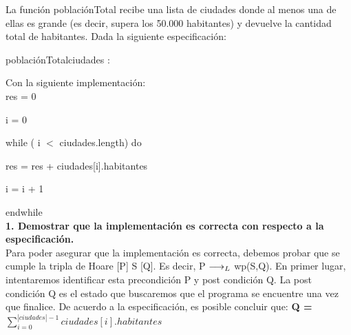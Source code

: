 \documentclass[10pt,a4paper]{article}
\begin{document}

La función poblaciónTotal recibe una lista de ciudades donde al menos una de ellas es grande (es decir, supera los 50.000 habitantes) y devuelve la cantidad total de habitantes. Dada la siguiente especificación:

\begin{proc}{poblaciónTotal}{\In ciudades : \TLista{\str\times\ent}}{\ent}
\end{proc}
Con la siguiente implementación:\\

    res = 0
    
    i = 0
    
    while ( i $<$ ciudades.length) do
    
    \hspace{0.7cm}res = res + ciudades[i].habitantes
    
    \hspace{0.7cm}i = i + 1
    
    endwhile\\

\textbf{1. Demostrar que la implementación es correcta con respecto a la especificación.}\\

Para poder asegurar que la implementación es correcta, debemos probar que se cumple la tripla de Hoare [P] S [Q]. Es decir, P $\longrightarrow _L$ wp(S,Q). En primer lugar, intentaremos identificar esta precondición P y post condición Q.
La post condición Q es el estado que buscaremos que el programa se encuentre una vez que finalice. De acuerdo a la especificación, es posible concluir que:
\textbf{{Q = ${\sum\limits_{i=0}^{|ciudades| - 1}ciudades[i].habitantes}$}}
\end{document}
